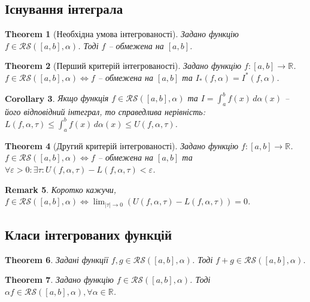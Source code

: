 \documentclass[a4paper, 10pt]{article}
\theoremstyle{theoremdd}
\newtheorem{theorem}{Theorem}[subsection]
\theoremstyle{theoremdd}
\theoremstyle{theoremdd}
\theoremstyle{theoremdd}
\theoremstyle{theoremdd}
\theoremstyle{theoremdd}
\theoremstyle{theoremdd}
\newtheorem{remark}[theorem]{Remark}
\theoremstyle{theoremdd}
\theoremstyle{theoremdd}
\newtheorem{corollary}[theorem]{Corollary}
\begin{document}
\subsection{Існування інтеграла}
\begin{theorem}[Необхідна умова інтегрованості]
Задано функцію $f \in \mathcal{RS}([a,b],\alpha)$. Тоді $f$ -- обмежена на $[a,b]$.
\end{theorem}

\begin{theorem}[Перший критерій інтегрованості]
Задано функцію $f \colon [a,b] \to \mathbb{R}$.\\
$f \in \mathcal{RS}([a,b],\alpha) \iff f$ -- обмежена на $[a,b]$ та $I_*(f,\alpha) = I^*(f,\alpha)$.
\end{theorem}

\begin{corollary}
Якщо функція $f \in \mathcal{RS}([a,b],\alpha)$ та $I = \displaystyle\int_a^b f(x)\,d\alpha(x)$ -- його відповідний інтеграл, то справедлива нерівність:\\
$L(f,\alpha,\tau) \leq \displaystyle\int_a^b f(x)\,d\alpha(x) \leq U(f,\alpha,\tau)$.
\end{corollary}

\begin{theorem}[Другий критерій інтегрованості]
Задано функцію $f \colon [a,b] \to \mathbb{R}$.\\
$f \in \mathcal{RS}([a,b],\alpha) \iff f$ -- обмежена на $[a,b]$ та $\forall \varepsilon > 0: \exists \tau: U(f,\alpha,\tau) - L(f,\alpha,\tau) < \varepsilon$.
\end{theorem}

\begin{remark}
Коротко кажучи, $f \in \mathcal{RS}([a,b],\alpha) \iff \displaystyle\lim_{|\tau| \to 0} (U(f,\alpha,\tau) - L(f,\alpha,\tau)) = 0$.
\end{remark}

\subsection{Класи інтегрованих функцій}
\begin{theorem}
Задані функції $f,g \in \mathcal{RS}([a,b],\alpha)$. Тоді $f+g \in \mathcal{RS}([a,b],\alpha)$.
\end{theorem}

\begin{theorem}
Задано функцію $f \in \mathcal{RS}([a,b],\alpha)$. Тоді $\alpha f \in \mathcal{RS}([a,b],\alpha), \forall \alpha \in \mathbb{R}$.
\end{theorem}
\end{document}
